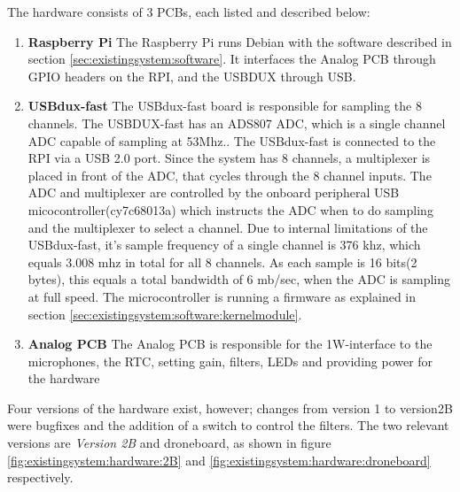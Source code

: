 The hardware consists of 3 PCBs, each listed and described below:
\begin{enumerate}
	\item \textbf{Raspberry Pi} The Raspberry Pi runs Debian with the software described in section \ref{sec:existingsystem:software}. It interfaces the Analog PCB through GPIO headers on the RPI, and the USBDUX through USB.
	
	\item \textbf{USBdux-fast} The USBdux-fast board is responsible for sampling the 8 channels. The USBDUX-fast has an ADS807 ADC, which is a single channel ADC capable of sampling at 53Mhz.\citep{ADC:ADS807}. The USBdux-fast is connected to the RPI via a USB 2.0 port.
Since the system has 8 channels, a multiplexer is placed in front of the ADC, that cycles through the 8 channel inputs.
The ADC and multiplexer are controlled by the onboard peripheral USB micocontroller(cy7c68013a) which instructs the ADC when to do sampling and the multiplexer to select a channel. Due to internal limitations of the USBdux-fast, it's sample frequency of a single channel is 376 khz, which equals 3.008 mhz in total for all 8 channels. As each sample is 16 bits(2 bytes), this equals a total bandwidth of 6 mb/sec, when the ADC is sampling at full speed. The microcontroller is running a firmware as explained in section \ref{sec:existingsystem:software:kernelmodule}.
	
	\item \textbf{Analog PCB} The Analog PCB is responsible for the 1W-interface to the microphones, the RTC, setting gain, filters, LEDs and providing power for the hardware
\end{enumerate}

Four versions of the hardware exist, however; changes from version 1 to version2B were bugfixes and the addition of a switch to control the filters. The two relevant versions are \textit{Version 2B} and droneboard, as shown in figure \ref{fig:existingsystem:hardware:2B} and \ref{fig:existingsystem:hardware:droneboard} respectively.

